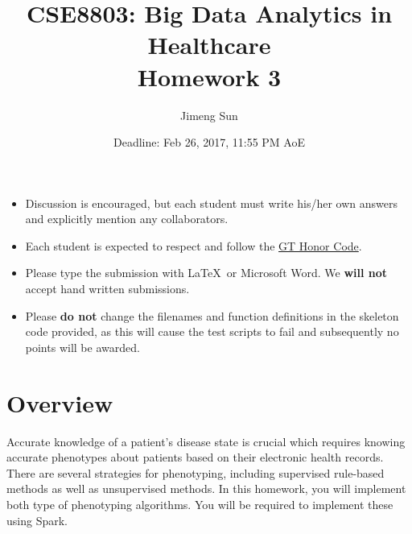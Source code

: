 \documentclass[12pt]{article}
\title{CSE8803: Big Data Analytics in Healthcare \\ Homework 3}
\author{Jimeng Sun}
\date{Deadline: Feb 26, 2017, 11:55 PM AoE}
\begin{document}
\maketitle
\begin{itemize}
\item Discussion is encouraged, but each student must write his/her own answers and explicitly mention any collaborators.
\item Each student is expected to respect and follow the \href{http://www.honor.gatech.edu/}{ GT Honor Code}.
\item Please type the submission with \LaTeX\ or Microsoft Word. We \textbf{will not} accept hand written submissions.
\item Please \textbf{do not} change the filenames and function definitions in the skeleton code provided, as this will cause the test scripts to fail and subsequently no points will be awarded. 
\end{itemize}


\section*{Overview}
Accurate knowledge of a patient's disease state is crucial which requires knowing accurate phenotypes about patients based on their electronic health records. %
There are several strategies for phenotyping, including supervised rule-based methods as well as unsupervised methods. 	
In this homework, you will implement both type of phenotyping algorithms. You will be required to implement these using Spark.
\end{document}
